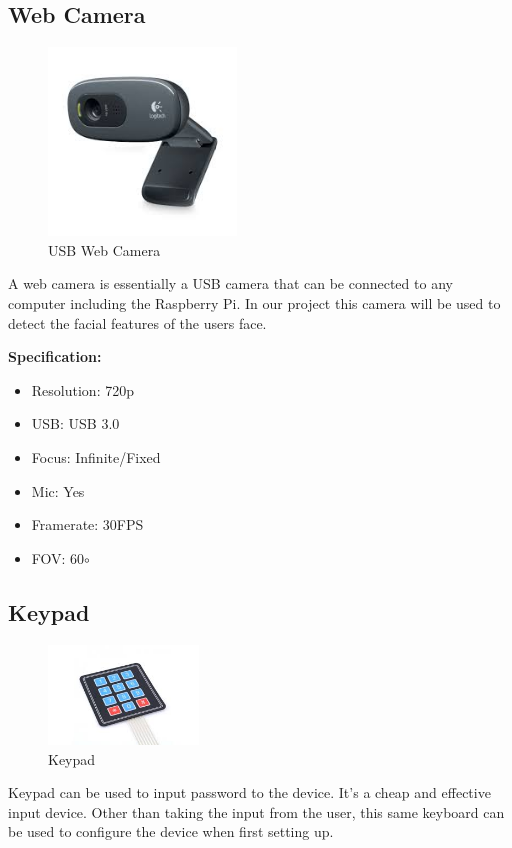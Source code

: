     \subsection{Web Camera}
        \begin{figure}[H]
            \centering
            \includegraphics[width=5cm]{images/webcam.jpg}
            \caption{USB Web Camera}
        \end{figure}
        \begin{flushleft}
            A web camera is essentially a USB camera that can be connected to any computer including the Raspberry Pi. In our project 
            this camera will be used to detect the facial features of the users face.
        \end{flushleft}
        \textbf{Specification: }
        \begin{itemize}
            \item Resolution: 720p
            \item USB: USB 3.0
            \item Focus: Infinite/Fixed
            \item Mic: Yes 
            \item Framerate: 30FPS
            \item FOV: 60$\circ$
        \end{itemize}

    \subsection{Keypad}
        \begin{figure}[H]
            \centering
            \includegraphics[width=4cm]{images/keypad.jpg}
            \caption{Keypad}
        \end{figure}
        \begin{flushleft}
            Keypad can be used to input password to the device. It's a cheap and effective input device. Other than taking the input from the user, 
            this same keyboard can be used to configure the device when first setting up.
        \end{flushleft}
        
